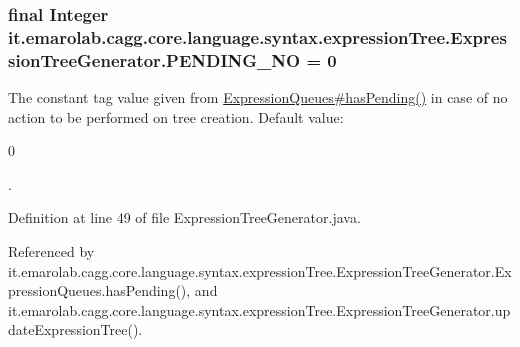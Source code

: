 \hypertarget{classit_1_1emarolab_1_1cagg_1_1core_1_1language_1_1syntax_1_1expressionTree_1_1ExpressionTreeGenerator_aafcadc158111ff425dfd1cbc86592eaa}{
\subsubsection[{P\-E\-N\-D\-I\-N\-G\-\_\-\-N\-O}]{\setlength{\rightskip}{0pt plus 5cm}final Integer it.\-emarolab.\-cagg.\-core.\-language.\-syntax.\-expression\-Tree.\-Expression\-Tree\-Generator.\-P\-E\-N\-D\-I\-N\-G\-\_\-\-N\-O = 0\hspace{0.3cm}{\ttfamily [static]}}}\label{classit_1_1emarolab_1_1cagg_1_1core_1_1language_1_1syntax_1_1expressionTree_1_1ExpressionTreeGenerator_aafcadc158111ff425dfd1cbc86592eaa}
The constant tag value given from \hyperlink{classit_1_1emarolab_1_1cagg_1_1core_1_1language_1_1syntax_1_1expressionTree_1_1ExpressionTreeGenerator_1_1ExpressionQueues_a3e49595a6682e2ca900f3813c126483d}{Expression\-Queues\#has\-Pending()} in case of no action to be performed on tree creation. Default value\-:
\begin{DoxyCode}
0 
\end{DoxyCode}
 . 

Definition at line 49 of file Expression\-Tree\-Generator.\-java.



Referenced by it.\-emarolab.\-cagg.\-core.\-language.\-syntax.\-expression\-Tree.\-Expression\-Tree\-Generator.\-Expression\-Queues.\-has\-Pending(), and it.\-emarolab.\-cagg.\-core.\-language.\-syntax.\-expression\-Tree.\-Expression\-Tree\-Generator.\-update\-Expression\-Tree().

